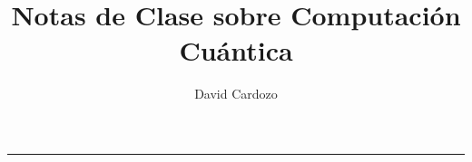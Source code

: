 \documentclass[notitlepage]{article}
\author{David Cardozo}
\title{Notas de Clase sobre Computación Cuántica}
\begin{document}



\noindent\rule{\textwidth}{1pt}\\[-0.1cm]


	
	
\end{document}
